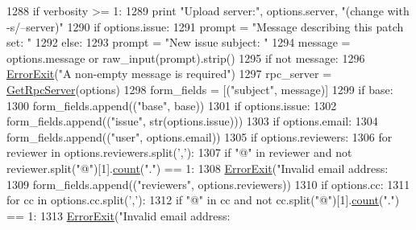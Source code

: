 \begin{DoxyCode}
{{1288   \textcolor{keywordflow}{if} verbosity >= 1:
1289     \textcolor{keywordflow}{print} \textcolor{stringliteral}{"Upload server:"}, options.server, \textcolor{stringliteral}{"(change with -s/--server)"}
1290   \textcolor{keywordflow}{if} options.issue:
1291     prompt = \textcolor{stringliteral}{"Message describing this patch set: "}
1292   \textcolor{keywordflow}{else}:
1293     prompt = \textcolor{stringliteral}{"New issue subject: "}
1294   message = options.message \textcolor{keywordflow}{or} raw\_input(prompt).strip()
1295   \textcolor{keywordflow}{if} \textcolor{keywordflow}{not} message:
1296     \hyperlink{namespaceupload_adea53186a1d73e92cc839b7c35c2c044}{ErrorExit}(\textcolor{stringliteral}{"A non-empty message is required"})
1297   rpc\_server = \hyperlink{namespaceupload_a1dadef480a702dbc5d0fb66203b9abe7}{GetRpcServer}(options)
1298   form\_fields = [(\textcolor{stringliteral}{"subject"}, message)]
1299   \textcolor{keywordflow}{if} base:
1300     form\_fields.append((\textcolor{stringliteral}{"base"}, base))
1301   \textcolor{keywordflow}{if} options.issue:
1302     form\_fields.append((\textcolor{stringliteral}{"issue"}, str(options.issue)))
1303   \textcolor{keywordflow}{if} options.email:
1304     form\_fields.append((\textcolor{stringliteral}{"user"}, options.email))
1305   \textcolor{keywordflow}{if} options.reviewers:
1306     \textcolor{keywordflow}{for} reviewer \textcolor{keywordflow}{in} options.reviewers.split(\textcolor{stringliteral}{','}):
1307       \textcolor{keywordflow}{if} \textcolor{stringliteral}{"@"} \textcolor{keywordflow}{in} reviewer \textcolor{keywordflow}{and} \textcolor{keywordflow}{not} reviewer.split(\textcolor{stringliteral}{"@"})[1].\hyperlink{gmock__stress__test_8cc_afd9db40e3361ae09188795e8cbe19752}{count}(\textcolor{stringliteral}{"."}) == 1:
1308         \hyperlink{namespaceupload_adea53186a1d73e92cc839b7c35c2c044}{ErrorExit}(\textcolor{stringliteral}{"Invalid email address: %
1309     form\_fields.append((\textcolor{stringliteral}{"reviewers"}, options.reviewers))
1310   \textcolor{keywordflow}{if} options.cc:
1311     \textcolor{keywordflow}{for} cc \textcolor{keywordflow}{in} options.cc.split(\textcolor{stringliteral}{','}):
1312       \textcolor{keywordflow}{if} \textcolor{stringliteral}{"@"} \textcolor{keywordflow}{in} cc \textcolor{keywordflow}{and} \textcolor{keywordflow}{not} cc.split(\textcolor{stringliteral}{"@"})[1].\hyperlink{gmock__stress__test_8cc_afd9db40e3361ae09188795e8cbe19752}{count}(\textcolor{stringliteral}{"."}) == 1:
1313         \hyperlink{namespaceupload_adea53186a1d73e92cc839b7c35c2c044}{ErrorExit}(\textcolor{stringliteral}{"Invalid email address: %
}}}}
\end{DoxyCode}
